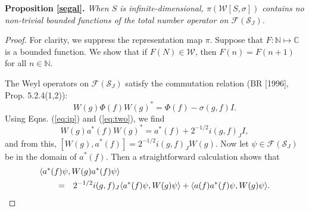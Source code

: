 \documentclass[12pt]{article}
\theoremstyle{remark}
\theoremstyle{definition}
\newcommand{\alg}[1]{\mathcal{#1}}
\newcommand{\hil}[1]{\mathcal{#1}}
\begin{document}
\noindent \textbf{Proposition \ref{segal}.} \emph{When $S$ is 
infinite-dimensional, $\pi(\alg{W}[S,\sigma])$
contains no non-trivial bounded functions of the total number operator
  on $\hil{F}(\hil{S}_{J})$.}  

\begin{proof} 
For clarity, we suppress the representation map $\pi$.  Suppose that 
$F:\mathbb{N}\mapsto \mathbb{C}$ is a bounded function.
  We show that if $F(N)\in \alg{W}$, then $F(n)=F(n+1)$ for all $n\in
  \mathbb{N}$.
  
  The Weyl operators on $\hil{F}(\hil{S}_{J})$ satisfy the commutation 
  relation (BR [1996], Prop. 5.2.4(1,2)):
  \begin{equation} \label{eq:note} W(g)\Phi (f)W(g)^{*}=\Phi (f)-\sigma(g,f)I
    .\end{equation} Using Eqns. (\ref{eq:ip}) and (\ref{eq:two}), we
  find \begin{equation} W(g)a^{*}(f)W(g)^{*}=a^{*}(f)+2^{-1/2}i(g,f)_{J}I
    ,\end{equation} and from this, $[W(g),a^{*}(f)]=2^{-1/2}i(g,f)_{J}W(g)$.  Now
  let $\psi \in \hil{F}(\hil{S}_{J})$ be in the domain of
  $a^{*}(f)$.  Then a straightforward calculation shows that
  \begin{eqnarray} \lefteqn{ \langle a^{*}(f)\psi ,W(g)a^{*}(f)\psi
  \rangle } \qquad \nonumber \\
&=& 2^{-1/2}i(g,f)_{J}\langle a^{*}(f)\psi ,W(g)\psi \rangle +\langle a(f)a^{*}(f)\psi
    ,W(g)\psi \rangle .\label{eq:landsman} \end{eqnarray}
  

\end{proof}
\end{document}

